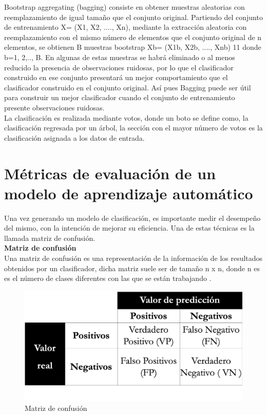 Bootstrap aggregating (bagging) consiste en obtener muestras aleatorias con reemplazamiento de igual tamaño que el conjunto original\citep{CT24}. Partiendo del conjunto de entrenamiento X= (X1, X2, ...., Xn), mediante la extracción aleatoria con reemplazamiento con el mismo número de elementos que el conjunto original de n elementos, se obtienen B muestras bootstrap Xb= (X1b, X2b, ...., Xnb)
11
donde b=1, 2,.., B. En algunas de estas muestras se habrá eliminado o al menos reducido la presencia de observaciones ruidosas, por lo que el clasificador construido en ese conjunto presentará un mejor comportamiento que el clasificador construido en el conjunto original. Así pues Bagging puede ser útil para construir un mejor clasificador cuando el conjunto de entrenamiento presente observaciones ruidosas.\\

La clasificación es realizada mediante votos, donde un boto se define como, la clasificación regresada por un árbol, la sección con el mayor número de votos es la clasificación asignada a los datos de entrada.




\section[Métricas de evaluación]{Métricas de evaluación de un modelo de aprendizaje automático}

Una vez generando un modelo de clasificación, es importante medir el desempeño del mismo, con
la intención de mejorar su eficiencia. Una de estas técnicas es la llamada matriz de confusión.\\

\textbf{Matriz de confusión}\\

Una matriz de confusión es una representación de la información de los resultados obtenidos por un
clasificador, dicha matriz suele ser de tamaño n x n, donde n es es el número de clases diferentes con
las que se están trabajando \citep{CT23}.

\begin{figure}[H]
	\centering
	\includegraphics[scale=.3]{imagenes/Capitulo3/MatrizC.png}
	\caption{Matriz de confusión}
	\label{Fig:mconfu}
\end{figure}

